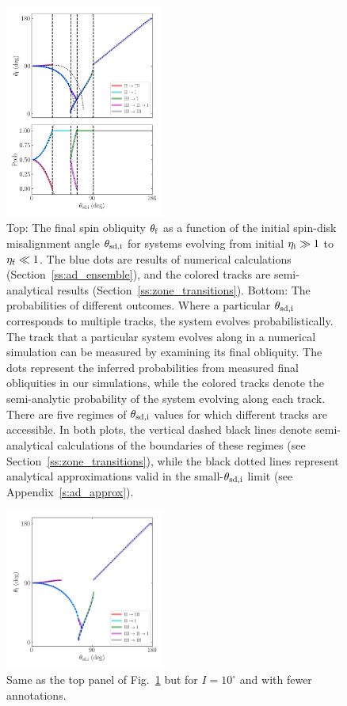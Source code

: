 \documentclass[twocolumn,twocolappendix]{aastex63}
\begin{document}
\begin{figure}
    \centering
    \includegraphics[width=0.47\textwidth]{plots_diskdisp/3_ensemble_05_35.png}
    \caption{Top: The final spin obliquity $\theta_{\rm f}$ as a function of the
    initial spin-disk misalignment angle $\theta_{\rm sd, i}$ for systems
    evolving from initial $\eta_{\rm i} \gg 1$ to $\eta_{\rm f} \ll 1$. The blue
    dots are results of numerical calculations (Section~\ref{ss:ad_ensemble}),
    and the colored tracks are semi-analytical results
    (Section~\ref{ss:zone_transitions}). Bottom: The probabilities of different
    outcomes. Where a particular $\theta_{\rm sd, i}$ corresponds to multiple
    tracks, the system evolves probabilistically. The track that a particular
    system evolves along in a numerical simulation can be measured by examining
    its final obliquity. The dots represent the inferred probabilities from
    measured final obliquities in our simulations, while the colored tracks
    denote the semi-analytic probability of the system evolving along each
    track. There are five regimes of $\theta_{\rm sd, i}$ values for which
    different tracks are accessible. In both plots, the vertical dashed black
    lines denote semi-analytical calculations of the boundaries of these regimes
    (see Section~\ref{ss:zone_transitions}), while the black dotted lines
    represent analytical approximations valid in the small-$\theta_{\rm sd, i}$
    limit (see Appendix~\ref{s:ad_approx}).}\label{fig:ad_ensemble}
\end{figure}
\begin{figure}
    \centering
    \includegraphics[width=0.47\textwidth]{plots_diskdisp/3_ensemble_10_35.png}
    \caption{Same as the top panel of Fig.~\ref{fig:ad_ensemble} but for $I =
    10^\circ$ and with fewer annotations.}\label{fig:3_ensemble_10_35}
\end{figure}
\end{document}
